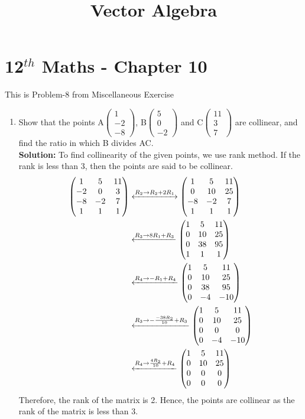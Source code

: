 \documentclass[12pt]{article}
\newcommand{\solution}{\noindent \textbf{Solution: }}
\newcommand{\myvec}[1]{\ensuremath{\begin{pmatrix}#1\end{pmatrix}}}
\begin{document}
\begin{center}
\title{\textbf{Vector Algebra}}
\date{\vspace{-5ex}} %
\maketitle
\end{center}
\setcounter{page}{1}

\section{12$^{th}$ Maths - Chapter 10}
This is Problem-8 from Miscellaneous Exercise
\begin{enumerate}
\item Show that the points A$\myvec{1\\-2\\-8}$, B$\myvec{5\\0\\-2}$ and C$\myvec{11\\3\\7}$ are collinear, and
find the ratio in which B divides AC.\\
\solution 
To find collinearity of the given points, we use rank method. If the rank is less than 3, then the points are said to be collinear.
\begin{align}
 \myvec{1&5&11\\-2&0&3\\-8&-2&7\\1&1&1} &\xleftrightarrow[]{R_2\rightarrow R_2+2R_1} \myvec{1&5&11\\0&10&25\\-8&-2&7\\1&1&1}\\
 &\xleftarrow[]{R_3\rightarrow 8R_1 + R_3} \myvec{1&5&11\\0&10&25\\0&38&95\\1&1&1}\\
 &\xleftarrow[]{R_4\rightarrow -R_1 + R_4} \myvec{1&5&11\\0&10&25\\0&38&95\\0&-4&-10}\\
 &\xleftarrow[]{R_3\rightarrow -\frac{-38R_2}{10} + R_3} \myvec{1&5&11\\0&10&25\\0&0&0\\0&-4&-10}\\
 &\xleftarrow[]{R_4\rightarrow \frac{4R_2}{10} + R_4} \myvec{1&5&11\\0&10&25\\0&0&0\\0&0&0}
\end{align}
Therefore, the rank of the matrix is 2. Hence, the points are collinear as the rank of the matrix is less than 3.\\ \\


\end{enumerate}
\end{document}
